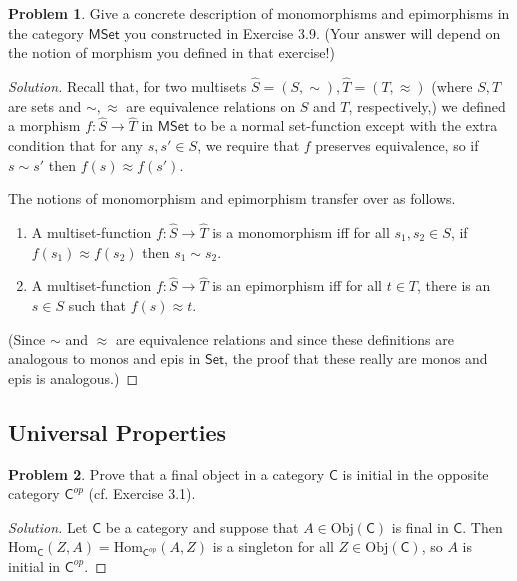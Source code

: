 \documentclass[fontsize=14pt]{scrartcl}
\theoremstyle{definition}
\newtheorem{problem-internal}{Problem}[subsection]
\newenvironment{problem}{
  \medskip
  \begin{problem-internal}
}{
  \end{problem-internal}
}
\newenvironment{solution}{
  \begin{proof}[Solution]
  \vspace{-8px}
  \setlength{\parskip}{4px}
  \setlength{\parindent}{0px}
}{
  \end{proof}
}
\newcommand{\Obj}{\mathrm{Obj}}
\newcommand{\Hom}{\mathrm{Hom}}
\begin{document}
\begin{problem}
\def \MSet {\mathsf{MSet}}
Give a concrete description of monomorphisms and epimorphisms in the category
$\MSet$ you constructed in Exercise 3.9. (Your answer will depend on the notion
of morphism you defined in that exercise!)
\end{problem}
\begin{solution}
\def \MSet {\mathsf{MSet}}
\def \Set {\mathsf{Set}}
Recall that, for two multisets $\hat{S}=(S,\sim),\hat{T}=(T,\approx)$ (where
$S,T$ are sets and $\sim,\approx$ are equivalence relations on $S$ and $T$,
respectively,) we defined a morphism $f:\hat{S}\to\hat{T}$ in $\MSet$ to be a
normal set-function except with the extra condition that for any $s,s'\in S$, we
require that $f$ preserves equivalence, so if $s\sim s'$ then $f(s)\approx
f(s')$.

The notions of monomorphism and epimorphism transfer over as follows.

\begin{enumerate}
\item A multiset-function $f:\hat{S}\to\hat{T}$ is a monomorphism iff for all
$s_1,s_2\in S$, if $f(s_1)\approx f(s_2)$ then $s_1\sim s_2$.
\item A multiset-function $f:\hat{S}\to\hat{T}$ is an epimorphism iff for all
$t\in T$, there is an $s\in S$ such that $f(s)\approx t$.
\end{enumerate}

(Since $\sim$ and $\approx$ are equivalence relations and since these
definitions are analogous to monos and epis in $\Set$, the proof that these
really are monos and epis is analogous.)
\end{solution}



\subsection{Universal Properties}


\begin{problem}
\def \C {\mathsf{C}}
\def \Cop {{\mathsf{C}^{op}}}
Prove that a final object in a category $\C$ is initial in the opposite category
$\Cop$ (cf. Exercise 3.1).
\end{problem}
\begin{solution}
\def \C {\mathsf{C}}
\def \Cop {{\mathsf{C}^{op}}}
Let $\C$ be a category and suppose that $A\in\Obj(\C)$ is final in $\C$. Then
$\Hom_\C(Z,A)=\Hom_\Cop(A,Z)$ is a singleton for all $Z\in\Obj(\C)$, so $A$ is
initial in $\Cop$.
\end{solution}
\end{document}
